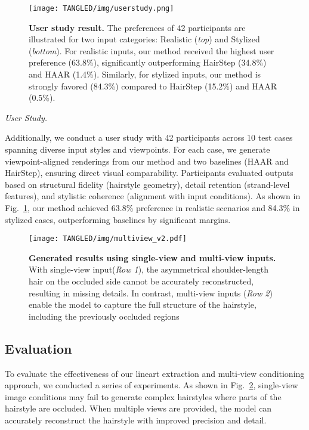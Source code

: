 \begin{figure}[thbp]
  \texttt{[image: TANGLED/img/userstudy.png]}
  \caption{\textbf{User study result.} The preferences of 42 participants are illustrated for two input categories: Realistic (\textit{top}) and Stylized (\textit{bottom}). For realistic inputs, our method received the highest user preference (63.8\%), significantly outperforming HairStep (34.8\%) and HAAR (1.4\%). Similarly, for stylized inputs, our method is strongly favored (84.3\%) compared to HairStep (15.2\%) and HAAR (0.5\%).  }

  \label{fig:user-study}
\end{figure}

\vspace{4pt}
\noindent \textit{User Study.}

Additionally, we conduct a user study with 42 participants across 10 test cases spanning diverse input styles and viewpoints. For each case, we generate viewpoint-aligned renderings from our method and two baselines (HAAR and HairStep), ensuring direct visual comparability. Participants evaluated outputs based on structural fidelity (hairstyle geometry), detail retention (strand-level features), and stylistic coherence (alignment with input conditions). As shown in Fig.~\ref{fig:user-study}, our method achieved 63.8\% preference in realistic scenarios and 84.3\% in stylized cases, outperforming baselines by significant margins.


\begin{figure}[tbp]
  \texttt{[image: TANGLED/img/multiview\_v2.pdf]}
  \caption{\textbf{Generated results using single-view and multi-view inputs.} With single-view input(\textit{Row 1}), the asymmetrical shoulder-length hair on the occluded side cannot be accurately reconstructed, resulting in missing details. In contrast, multi-view inputs (\textit{Row 2}) enable the model to capture the full structure of the hairstyle, including the previously occluded regions }
  \label{fig:multiview}
\end{figure}

\subsection{Evaluation}
To evaluate the effectiveness of our lineart extraction and multi-view conditioning approach, we conducted a series of experiments. 
As shown in Fig.~\ref{fig:multiview}, single-view image conditions may fail to generate complex hairstyles where parts of the hairstyle are occluded. When multiple views are provided, the model can accurately reconstruct the hairstyle with improved precision and detail.

